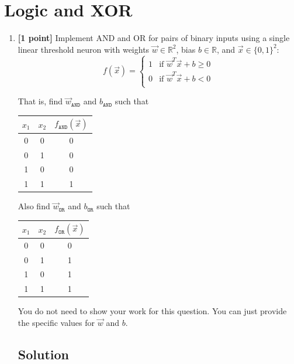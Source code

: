 \documentclass[11pt,english]{article}
\begin{document}
\section{Logic and XOR}
\begin{enumerate}

\item
\textbf{[1 point]}
Implement AND and OR for pairs of binary inputs using a single linear threshold neuron
with weights $\vec{w} \in \mathbb{R}^2$, bias $b \in \mathbb{R}$, and $\vec{x} \in \{0, 1\}^2$:
\begin{equation}
    f(\vec{x}) = 
    \begin{cases}
        1 & \text{if } \vec{w}^T \vec{x} + b \ge 0 \\
        0 & \text{if } \vec{w}^T \vec{x} + b < 0 \\
    \end{cases}
    \label{eq:linear_threshold}
\end{equation}

That is, find $\vec{w}_{\texttt{AND}}$ and $b_{\texttt{AND}}$ such that
\begin{center}
\begin{tabular}{|c|c|c|} 
\hline
$x_1$ & $x_2$ & $f_{\texttt{AND}}(\vec{x})$ \\ 
\hline
0 & 0 & 0 \\
0 & 1 & 0 \\
1 & 0 & 0 \\
1 & 1 & 1 \\
\hline
\end{tabular}
\end{center}

Also find $\vec{w}_{\texttt{OR}}$ and $b_{\texttt{OR}}$ such that
\begin{center}
\begin{tabular}{|c|c|c|} 
\hline
$x_1$ & $x_2$ & $f_{\texttt{OR}}(\vec{x})$ \\ 
\hline
0 & 0 & 0 \\
0 & 1 & 1 \\
1 & 0 & 1 \\
1 & 1 & 1 \\
\hline
\end{tabular}
\end{center}

You do not need to show your work for this question. You can just provide the specific values for $\vec{w}$ and $b$.

\subsection*{Solution}


\end{enumerate}
\end{document}
